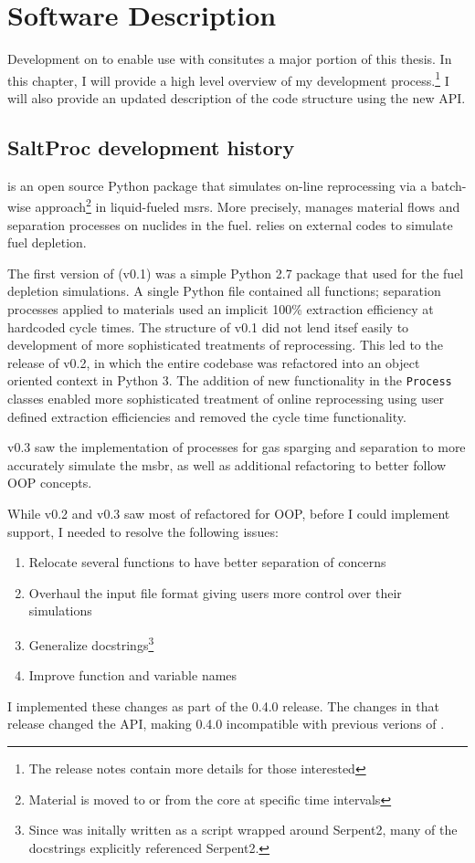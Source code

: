 \chapter{Software Description}
Development on \SaltProc to enable use with \OpenMC consitutes a major portion
of this thesis. In this chapter, I will provide a high level overview
of my development process.\footnote{The release notes
contain more details for those interested} I will also provide an updated
description of the code structure using the new API. 

\section{SaltProc development history}%
\label{sub:saltproc-hisory}

\SaltProc\cite{rykhlevskii_saltproc_2018} is an open source Python package that
simulates on-line reprocessing via a batch-wise approach\footnote{Material is
moved to or from the core at specific time intervals} in liquid-fueled
\Gls{msr}s. More precisely, \SaltProc manages material flows and separation
processes on nuclides in the fuel. \SaltProc relies on external codes to simulate
fuel depletion.

The first version of \SaltProc (v0.1) was a simple Python 2.7 package that used
\SerpentTWO for the fuel depletion simulations. A single Python file contained
all functions; separation processes applied to materials used an implicit 100\%
extraction efficiency at hardcoded cycle times\cite{rykhlevskii_advanced_2018}.
The structure of \SaltProc v0.1 did not lend itsef easily to development of more
sophisticated treatments of reprocessing. This led to the release of \SaltProc
v0.2, in which the entire codebase was refactored into an object oriented
context in Python 3. The addition of new functionality in the \verb.Process.
classes enabled more sophisticated treatment of online reprocessing using user
defined extraction efficiencies and removed the cycle time functionality\cite{rykhlevskii_fuel_2020}.

\SaltProc v0.3 saw the implementation of processes for gas sparging and
separation to more accurately simulate the \gls{msbr}, as well as additional
refactoring to better follow OOP concepts.

While v0.2 and v0.3 saw most of \SaltProc refactored for OOP, before I could
implement \OpenMC support, I needed to resolve the following issues:
\begin{enumerate}
    \item Relocate several functions to have better separation of concerns
    \item Overhaul the \SaltProc input file format giving users more control over their simulations
    \item Generalize docstrings\footnote{Since \SaltProc was initally written as a script wrapped around Serpent2, many of the docstrings explicitly referenced Serpent2.}
    \item Improve function and variable names
\end{enumerate}
I implemented these changes as part of the 0.4.0 release. The changes in that
release changed the API, making 0.4.0 incompatible with previous verions of \SaltProc.

